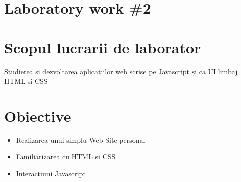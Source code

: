 \section*{Laboratory work \#2}

\section{Scopul lucrarii de laborator}
	Studierea și dezvoltarea aplicațiilor web scrise pe Javascript și ca UI limbaj HTML și CSS
	
\section{Obiective}

	\begin{itemize}
		\item Realizarea unui simplu Web Site personal
		\item Familiarizarea cu HTML si CSS
		\item Interactiuni Javascript
	\end{itemize}

\clearpage